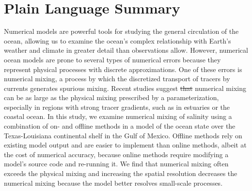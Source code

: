 \documentclass[draft]{agujournal2019}
\providecommand{\DIFadd}[1]{{\protect\color{blue}\uwave{#1}}} %
\providecommand{\DIFdel}[1]{{\protect\color{red}\sout{#1}}}                      %
\providecommand{\DIFaddbegin}{} %
\providecommand{\DIFaddend}{} %
\providecommand{\DIFdelbegin}{} %
\providecommand{\DIFdelend}{} %
\begin{document}
\section*{Plain Language Summary}
\noindent Numerical models are powerful tools for studying the general circulation of the ocean, allowing us to examine the ocean's complex relationship with Earth's weather and climate in greater detail than observations allow. However, numerical ocean models are prone to several types of numerical errors because they represent physical processes with discrete approximations. One of these errors is numerical mixing, a process by which the discretized transport of tracers by currents generates spurious mixing. Recent studies suggest \DIFdelbegin \DIFdel{that }\DIFdelend numerical mixing can be as large as the physical mixing prescribed by a parameterization, especially in regions with strong tracer gradients, such as in estuaries or the coastal ocean. In this study, we examine numerical mixing of salinity using a combination of on- and offline methods in a model of the ocean state over the Texas-Louisiana continental shelf in the Gulf of Mexico. Offline methods rely on existing model output and are \DIFaddbegin \DIFadd{often }\DIFaddend easier to implement than online methods, albeit at the cost of numerical accuracy, because online methods require modifying a model's source code and re-running it. We find that numerical mixing often exceeds the physical mixing and increasing the spatial resolution decreases the numerical mixing because the model better resolves small-scale processes.


%
%

%

\end{document}
